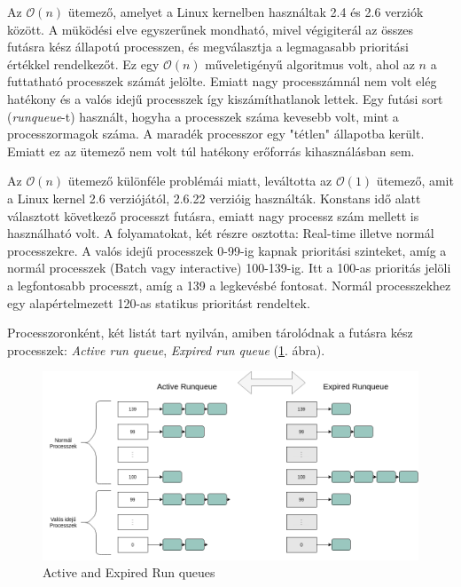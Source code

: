Az $\mathcal{O}(n)$ ütemező, amelyet a Linux kernelben használtak 2.4 és 2.6 verziók között. A müködési elve egyszerűnek mondható, mivel végigiterál az összes futásra kész állapotú processzen, és megválasztja a legmagasabb prioritási értékkel rendelkezőt.
Ez egy $\mathcal{O}(n)$ műveletigényű algoritmus volt, ahol az $n$ a futtatható processzek számát jelölte. Emiatt nagy processzámnál nem volt elég hatékony és a valós idejű processzek így kiszámíthatlanok lettek.
Egy futási sort (\textit{runqueue}-t) használt, hogyha a processzek száma kevesebb volt, mint a processzormagok száma. A maradék processzor egy "tétlen" állapotba került. Emiatt ez az ütemező nem volt túl hatékony erőforrás kihasználásban sem.


Az $\mathcal{O}(n)$ ütemező különféle problémái miatt, leváltotta az $\mathcal{O}(1)$ ütemező, amit a Linux kernel 2.6 verziójától, 2.6.22 verzióig használták. 
Konstans idő alatt választott következő processzt futásra, emiatt nagy processz szám mellett is használható volt.
A folyamatokat, két részre osztotta: Real-time illetve normál processzekre. A valós idejű processzek 0-99-ig kapnak prioritási szinteket, amíg a normál processzek (Batch vagy interactive) 100-139-ig. Itt a 100-as prioritás jelöli a legfontosabb processzt, amíg a 139 a legkevésbé fontosat. Normál processzekhez egy alapértelmezett 120-as statikus prioritást rendeltek. 


Processzoronként, két listát tart nyilván, amiben tárolódnak a futásra kész processzek: \textit{Active run queue}, \textit{Expired run queue} (\ref{fig:activeExpiredRunqueue}. ábra).

\begin{figure}[h]
\centering
\includegraphics[width=\textwidth]{images/activeExpiredRunqueue.png}
\caption{Active and Expired Run queues}
\label{fig:activeExpiredRunqueue}
\end{figure}


